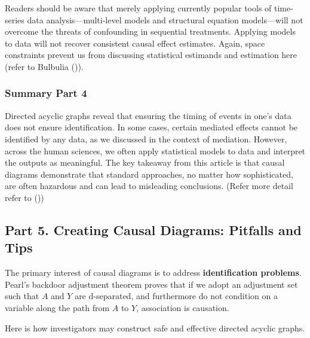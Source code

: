 \documentclass[
  single column]{article}
\begin{document}
Readers should be aware that merely applying currently popular tools of
time-series data analysis---multi-level models and structural equation
models---will not overcome the threats of confounding in sequential
treatments. Applying models to data will not recover consistent causal
effect estimates. Again, space constraints prevent us from discussing
statistical estimands and estimation here (refer to Bulbulia
()).

\subsubsection{Summary Part 4}\label{summary-part-4}

Directed acyclic graphs reveal that ensuring the timing of events in
one's data does not ensure identification. In some cases, certain
mediated effects cannot be identified by any data, as we discussed in
the context of mediation. However, across the human sciences, we often
apply statistical models to data and interpret the outputs as
meaningful. The key takeaway from this article is that causal diagrams
demonstrate that standard approaches, no matter how sophisticated, are
often hazardous and can lead to misleading conclusions. (Refer more
detail refer to ())

\subsection{Part 5. Creating Causal Diagrams: Pitfalls and
Tips}\label{id-sec-5}

The primary interest of causal diagrams is to address
\textbf{identification problems}. Pearl's backdoor adjustment theorem
proves that if we adopt an adjustment set such that \(A\) and \(Y\) are
d-separated, and furthermore do not condition on a variable along the
path from \(A\) to \(Y\), association is causation.

Here is how investigators may construct safe and effective directed
acyclic graphs.
\end{document}
